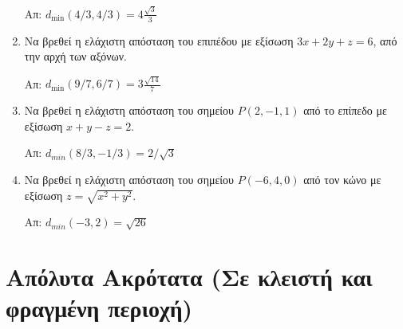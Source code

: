 \documentclass[a4paper,table]{report}
\begin{document}
\begin{enumerate}
    \hfill Απ: $ d_{\min}(4/3,4/3) = 4\frac{\sqrt{3}}{3} $  

  \item Να βρεθεί η ελάχιστη απόσταση του επιπέδου με εξίσωση $ 3x+2y+z=6 $, από την 
    αρχή των αξόνων.

    \hfill Απ: $ d_{\min}(9/7,6/7) = 3\frac{\sqrt{14}}{7} $  

  \item Να βρεθεί η ελάχιστη απόσταση του σημείου $ P(2,-1,1) $ από το επίπεδο με 
    εξίσωση $ x+y-z=2 $. 
    
    \hfill Απ: $ d_{min}(8/3,-1/3) = 2 /\sqrt{3} $ 

  \item Να βρεθεί η ελάχιστη απόσταση του σημείου $ P(-6,4,0) $ από τον κώνο με 
    εξίσωση $ z = \sqrt{x^{2}+y^{2}} $. 
    
    \hfill Απ: $ d_{min}(-3,2) = \sqrt{26} $ 

\end{enumerate}


\section*{Απόλυτα Ακρότατα (Σε κλειστή και φραγμένη περιοχή)}
\end{document}
